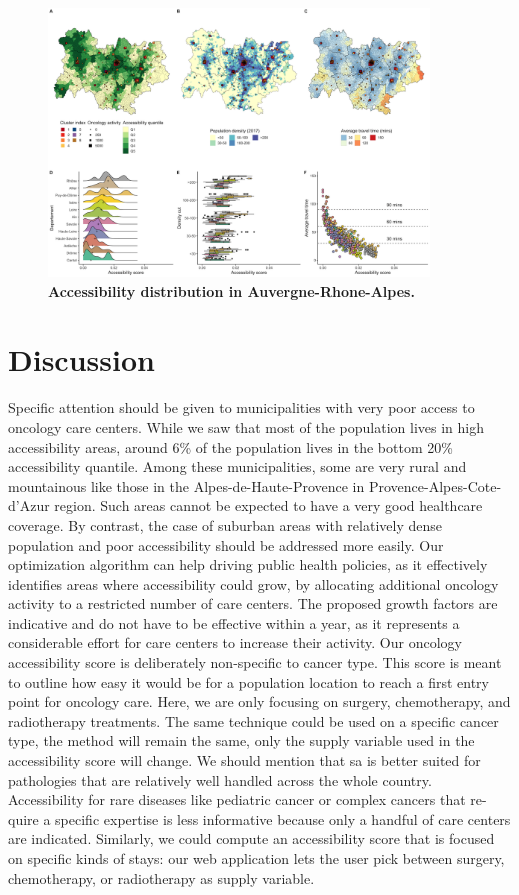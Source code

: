 \begin{figure}[H]
    \includegraphics[width=0.9\textwidth]{images/camion/region_accessibility/accessibility_Auvergne-Rhone-Alpes.png}
    \centering
    \caption{
        \textbf{Accessibility distribution in Auvergne-Rhone-Alpes.}
    }
\end{figure}

\section{Discussion}

Specific attention should be given to municipalities with very poor access to oncology care centers. While we saw that most of the population lives in high accessibility areas, around 6\% of the population lives in the bottom 20\% accessibility quantile. Among these municipalities, some are very rural and mountainous like those in the Alpes-de-Haute-Provence in Provence-Alpes-Cote-d'Azur region. Such areas cannot be expected to have a very good healthcare coverage. By contrast, the case of suburban areas with relatively dense population and poor accessibility should be addressed more easily. Our optimization algorithm can help driving public health policies, as it effectively identifies areas where accessibility could grow, by allocating additional oncology activity to a restricted number of care centers. The proposed growth factors are indicative and do not have to be effective within a year, as it represents a considerable effort for care centers to increase their activity.
Our oncology accessibility score is deliberately non-specific to cancer type. This score is meant to outline how easy it would be for a population location to reach a first entry point for oncology care. Here, we are only focusing on surgery, chemotherapy, and radiotherapy treatments. The same technique could be used on a specific cancer type, the method will remain the same, only the supply variable used in the accessibility score will change. We should mention that \ac{sa} is better suited for pathologies that are relatively well handled across the whole country. Accessibility for rare diseases like pediatric cancer or complex cancers that re-quire a specific expertise is less informative because only a handful of care centers are indicated.
Similarly, we could compute an accessibility score that is focused on specific kinds of stays: our web application lets the user pick between surgery, chemotherapy, or radiotherapy as supply variable.
